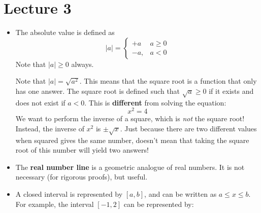 \section{Lecture 3}
\begin{itemize}
    \item The absolute value is defined as
    \begin{equation}
        |a|=\begin{cases}
            +a \,& a \ge 0 \\ 
            -a, & a < 0
        \end{cases}
        \label{eq:}
    \end{equation}
    Note that $|a| \ge 0$ always.
    \begin{warning}
        Note that $|a|=\sqrt{a^2}$. This means that the square root is a function that only has one answer. The square root is defined such that $\sqrt{a} \ge 0$ if it exists and does not exist if $a<0$. This is \textbf{different} from solving the equation:
        \begin{equation}
            x^2=4
            \label{eq:}
        \end{equation}
        We want to perform the inverse of a square, which is \textit{not} the square root! Instead, the inverse of $x^2$ is $\pm \sqrt{x}$. Just because there are two different values when squared gives the same number, doesn't mean that taking the square root of this number will yield two answers!
    \end{warning}
    \item The \textbf{real number line} is a geometric analogue of real numbers. It is not necessary (for rigorous proofs), but useful.
    \item A closed interval is represented by $[a,b]$, and can be written as $a \le x \le b$. For example, the interval $[-1,2]$ can be represented by:
    \begin{center}

\end{center}
\end{itemize}
